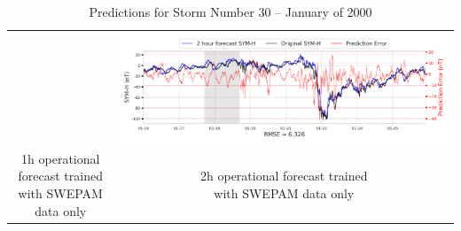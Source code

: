 \documentclass[draft,sw]{agutexSI2019}
\begin{document}
\begin{table}
\begin{tabular}{cc}
&
\includegraphics[width=0.49\linewidth]{paper_plots_shade/2h_swepam_rt/2h_swepam_rt_storm_30.png}
\\
\shortstack{1h operational forecast trained\\ with SWEPAM data only} & \shortstack{2h operational forecast trained\\ with SWEPAM data only}
\vspace*{12pt}
\\
\end{tabular}
\caption{Predictions for Storm Number 30 -- January of 2000}
\label{storm-30}
\end{table}
\end{document}
